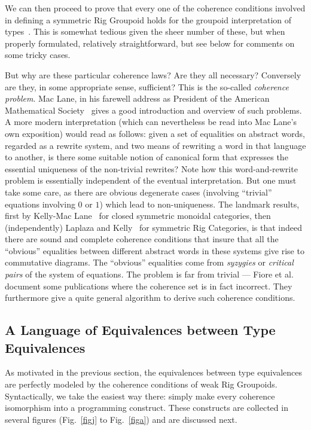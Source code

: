 \documentclass{article}
\begin{document}
We can then proceed to prove that every one of the coherence conditions
involved in defining a symmetric Rig Groupoid holds for the groupoid
interpretation of types~\cite{Carette2016}.  This is somewhat tedious
given the sheer number of these, but when properly formulated,
relatively straightforward, but see below for comments on some
tricky cases.

But why are these particular coherence laws? Are they all necessary?
Conversely are they, in some appropriate sense, sufficient? This is
the so-called \emph{coherence problem}. Mac Lane, in his farewell address
as President of the American Mathematical Society~\cite{MacLane1976} gives
a good introduction and overview of such problems.  A more modern
interpretation (which can nevertheless be read into Mac Lane's own
exposition) would read as follows: given a set of equalities on abstract
words, regarded as a rewrite system, and two means of rewriting a word
in that language to another, is there some suitable notion of canonical
form that expresses the essential uniqueness of the non-trivial
rewrites?  Note how this word-and-rewrite problem is essentially
independent of the eventual interpretation. But one must take some care,
as there are obvious degenerate cases (involving ``trivial'' equations
involving $0$ or $1$) which lead to non-uniqueness. The landmark
results, first by Kelly-Mac Lane~\cite{KELLY197197} for closed
symmetric monoidal categories, then (independently) Laplaza and
Kelly~\cite{laplaza72,kelly74} for symmetric Rig Categories, is
that indeed there are sound and complete coherence conditions that
insure that all the ``obvious'' equalities between different abstract
words in these systems give rise to commutative diagrams. The
``obvious'' equalities come from \emph{syzygies} or
\emph{critical pairs} of the system of equations.
The problem is far from trivial --- Fiore et al.~\cite{Fiore-2008}
document some publications where the coherence set is in
fact incorrect. They furthermore give a quite general algorithm
to derive such coherence conditions.

\subsection{A Language of Equivalences between Type Equivalences}
\label{langeqeq}

As motivated in the previous section, the equivalences between type
equivalences are perfectly modeled by the coherence conditions of weak
Rig Groupoids. Syntactically, we take the easiest way there: simply
make every coherence isomorphism into a programming construct. These
constructs are collected in several figures (Fig.~\ref{figj} to
Fig.~\ref{figa}) and are discussed next.
\end{document}
